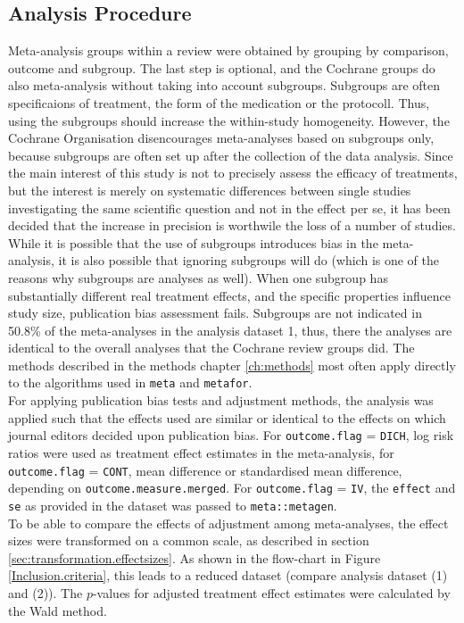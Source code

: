 \documentclass[11pt,a4paper,twoside]{book}\usepackage[]{graphicx}\usepackage[]{color}
\begin{document}
\subsection{Analysis Procedure} \label{sec:procedure}
Meta-analysis groups within a review were obtained by grouping by comparison, outcome and subgroup. The last step is optional, and the Cochrane groups do also meta-analysis without taking into account subgroups. Subgroups are often specificaions of treatment, \eg the form of the medication or the protocoll. Thus, using the subgroups should increase the within-study homogeneity. However, the Cochrane Organisation disencourages meta-analyses based on subgroups only, because subgroups are often set up after the collection of the data analysis. Since the main interest of this study is not to precisely assess the efficacy of treatments, but the interest is merely on systematic differences between single studies investigating the same scientific question and not in the effect per se, it has been decided that the increase in precision is worthwile the loss of a number of studies. While it is possible that the use of subgroups introduces bias in the meta-analysis, it is also possible that ignoring subgroups will do (which is one of the reasons why subgroups are analyses as well). When one subgroup has substantially different real treatment effects, and the specific properties influence study size, publication bias assessment fails. Subgroups are not indicated in 50.8\% of the meta-analyses in the analysis dataset 1, thus, there the analyses are identical to the overall analyses that the Cochrane review groups did.
The methods described in the methods chapter \ref{ch:methods} most often apply directly to the algorithms used in \texttt{meta} and \texttt{metafor}. \\
For applying publication bias tests and adjustment methods, the analysis was applied such that the effects used are similar or identical to the effects on which journal editors decided upon publication bias. For \texttt{outcome.flag} = \texttt{DICH}, log risk ratios were used as treatment effect estimates in the meta-analysis, for \texttt{outcome.flag} = \texttt{CONT}, mean difference or standardised mean difference, depending on \texttt{outcome.measure.merged}. For \texttt{outcome.flag} = \texttt{IV}, the \texttt{effect} and \texttt{se} as provided in the dataset was passed to \texttt{meta::metagen}. \\ 
To be able to compare the effects of adjustment among meta-analyses, the effect sizes were transformed on a common scale, as described in section \ref{sec:transformation.effectsizes}. As shown in the flow-chart in Figure \ref{Inclusion.criteria}, this leads to a reduced dataset (compare analysis dataset (1) and (2)). The $p$-values for adjusted treatment effect estimates were calculated by the Wald method. \\
\end{document}
